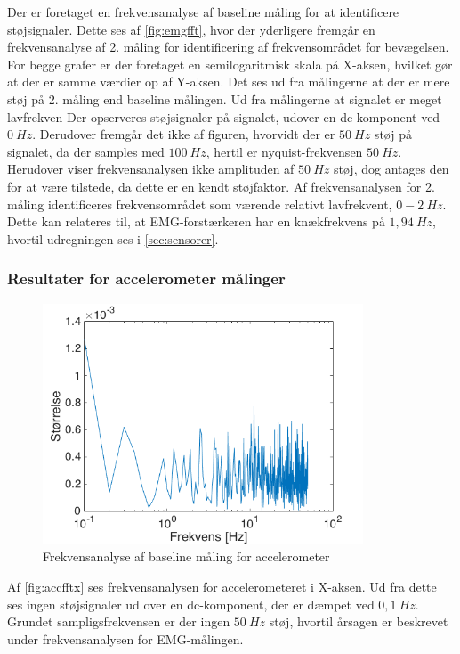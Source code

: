 Der er foretaget en frekvensanalyse af baseline måling for at identificere støjsignaler. Dette ses af \autoref{fig:emgfft}, hvor der yderligere fremgår en frekvensanalyse af 2. måling for identificering af frekvensområdet for bevægelsen. For begge grafer er der foretaget en semilogaritmisk skala på X-aksen, hvilket gør at der er samme værdier op af Y-aksen. Det ses ud fra målingerne at der er mere støj på 2. måling end baseline målingen. Ud fra målingerne at signalet er meget lavfrekven 
Der opserveres støjsignaler på signalet, udover en dc-komponent ved $0~Hz$. Derudover fremgår det ikke af figuren, hvorvidt der er $50~Hz$ støj på signalet, da der samples med $100~Hz$, hertil er nyquist-frekvensen $50~Hz$. Herudover viser frekvensanalysen ikke amplituden af $50~Hz$ støj, dog antages den for at være tilstede, da dette er en kendt støjfaktor. Af frekvensanalysen for 2. måling identificeres frekvensområdet som værende relativt lavfrekvent, $0-2~Hz$. Dette kan relateres til, at EMG-forstærkeren har en knækfrekvens på $1,94~Hz$, hvortil udregningen ses i \autoref{sec:sensorer}. 


\subsubsection{Resultater for accelerometer målinger} \label{sec:acc_fft}

\begin{figure}[H]
	\centering
	\includegraphics[width=0.85\textwidth]{figures/Pilotforsoeg/accfft.png}
	\caption{Frekvensanalyse af baseline måling for accelerometer}
	\label{fig:accfftx}
\end{figure}
Af \autoref{fig:accfftx} ses frekvensanalysen for accelerometeret i X-aksen. Ud fra dette ses ingen støjsignaler ud over en dc-komponent, der er dæmpet ved $0,1~Hz$. Grundet sampligsfrekvensen er der ingen $50~Hz$ støj, hvortil årsagen er beskrevet under frekvensanalysen for EMG-målingen. 

